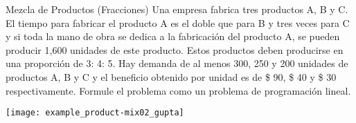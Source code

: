 \begin{frameExample}{Mezcla de Productos (Fracciones)}{}
Una empresa fabrica tres productos A, B y C. El tiempo para fabricar el producto A es el doble que para B y tres veces para C y si toda la mano de obra se dedica a la fabricación del producto A, se pueden producir 1,600 unidades de este producto. Estos productos deben producirse en una proporción de 3: 4: 5. Hay demanda de al menos 300, 250 y 200 unidades de productos A, B y C y el beneficio obtenido por unidad es de \$ 90, \$ 40 y \$ 30 respectivamente. Formule el problema como un problema de programación lineal.

{\centering
\texttt{[image: example\_product-mix02\_gupta]}
\par}

\end{frameExample}



